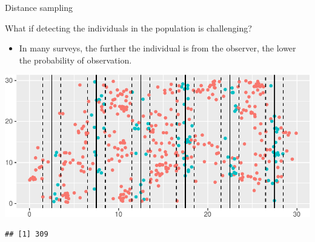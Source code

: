 \documentclass[
  ignorenonframetext,
]{beamer}
\newenvironment{Shaded}{\begin{snugshade}}{\end{snugshade}}
\newcommand{\KeywordTok}[1]{\textcolor[rgb]{0.13,0.29,0.53}{\textbf{#1}}}
\newcommand{\NormalTok}[1]{#1}
\newcommand{\OperatorTok}[1]{\textcolor[rgb]{0.81,0.36,0.00}{\textbf{#1}}}
\newcommand{\StringTok}[1]{\textcolor[rgb]{0.31,0.60,0.02}{#1}}
\providecommand{\tightlist}{%
  \setlength{\itemsep}{0pt}\setlength{\parskip}{0pt}}
\begin{document}
\begin{frame}[fragile]{Distance sampling}
\protect\hypertarget{distance-sampling}{}

What if detecting the individuals in the population is challenging?

\begin{itemize}
\tightlist
\item
  In many surveys, the further the individual is from the observer, the
  lower the probability of observation.
\end{itemize}

\scriptsize

\includegraphics{distance_sampling_files/figure-beamer/unnamed-chunk-10-1.pdf}

\begin{Shaded}
\end{Shaded}

\begin{verbatim}
## [1] 309
\end{verbatim}

\end{frame}
\end{document}
